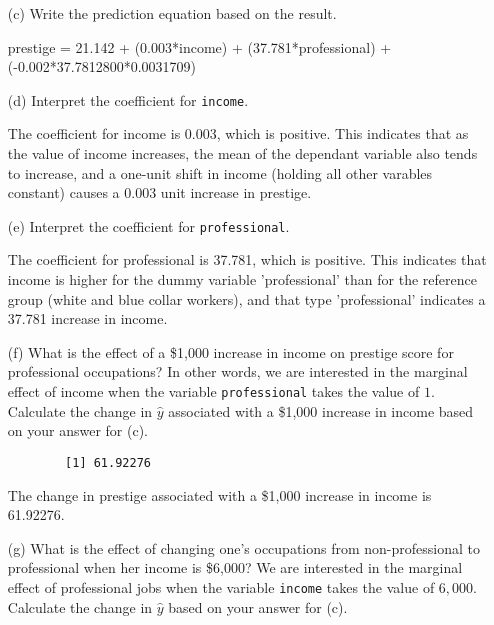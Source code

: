 \documentclass[12pt,letterpaper]{article}
\begin{document}
\begin{enumerate}
	\newpage
	\item [(c)]
	Write the prediction equation based on the result.
	
\noindent prestige = 21.142 + (0.003*income) + (37.781*professional) + (-0.002*37.7812800*0.0031709)
	
	\item [(d)]
	Interpret the coefficient for \texttt{income}.
	
	\noindent The coefficient for income is 0.003, which is positive. This indicates that as 
	the value of income increases, the mean of the dependant variable also tends to increase,
	and a one-unit shift in income (holding all other varables constant) causes a 0.003 unit 
	increase in prestige. 
	
	\vspace{.25cm}	
	\item [(e)]
	Interpret the coefficient for \texttt{professional}.
	
	\noindent The coefficient for professional is 37.781, which is positive. This indicates that
	income is higher for the dummy variable 'professional' than for the reference group 
	(white and blue collar workers), and that type 'professional' indicates a 37.781 
	increase in income.
	
	\item [(f)]
	What is the effect of a \$1,000 increase in income on prestige score for professional occupations? In other words, we are interested in the marginal effect of income when the variable \texttt{professional} takes the value of $1$. Calculate the change in $\hat{y}$ associated with a \$1,000 increase in income based on your answer for (c).
	
		
	\vspace{.1cm}
	
	\begin{verbatim}
		[1] 61.92276
	\end{verbatim}

\noindent The change in prestige associated with a \$1,000 increase in income is 61.92276.
	
	\vspace{.25cm}
	
	
	\item [(g)]
	What is the effect of changing one's occupations from non-professional to professional when her income is \$6,000? We are interested in the marginal effect of professional jobs when the variable \texttt{income} takes the value of $6,000$. Calculate the change in $\hat{y}$ based on your answer for (c).
	

\end{enumerate}
\end{document}
